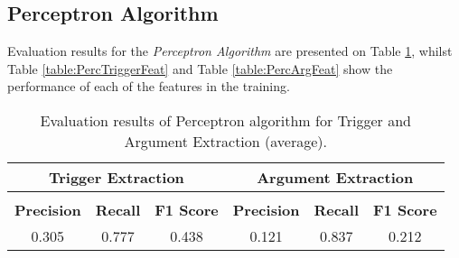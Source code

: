 \documentclass{article} %
\begin{document}

\subsection*{Perceptron Algorithm}
Evaluation results for the \textit{Perceptron Algorithm} are presented on Table \ref{table:EvalPerc}, whilst Table \ref{table:PercTriggerFeat} and Table \ref{table:PercArgFeat} show the performance of each of the features in the training.


\begin{table}[!hbp]
\caption{Evaluation results of Perceptron algorithm for Trigger and Argument Extraction (average).}
\begin{center}
\label{table:EvalPerc}
\begin{tabular}{c c c c c c}
\multicolumn{3}{c}{\bf Trigger Extraction}  &\multicolumn{3}{c}{\bf Argument Extraction}
\\ \hline \\
\textbf{Precision} & \textbf{Recall} & \textbf{F1 Score} & \textbf{Precision} & \textbf{Recall} & \textbf{F1 Score}\\
0.305 & 0.777 & 0.438 & 0.121 & 0.837 & 0.212\\
\end{tabular}
\end{center}
\end{table}
\end{document}

